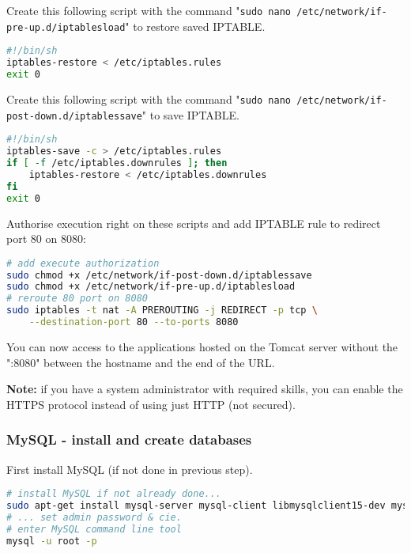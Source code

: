 Create this following script with the command "\texttt{sudo nano /etc/network/if-pre-up.d/iptablesload}" to restore saved IPTABLE.
\begin{lstlisting}[language=bash,caption={/etc/network/if-pre-up.d/iptablesload},frame=bt]
#!/bin/sh
iptables-restore < /etc/iptables.rules
exit 0
\end{lstlisting}

Create this following script with the command "\texttt{sudo nano /etc/network/if-post-down.d/iptablessave}" to save IPTABLE.
\begin{lstlisting}[language=bash,caption={/etc/network/if-post-down.d/iptablessave},frame=bt]
#!/bin/sh
iptables-save -c > /etc/iptables.rules
if [ -f /etc/iptables.downrules ]; then
	iptables-restore < /etc/iptables.downrules
fi
exit 0
\end{lstlisting}

Authorise execution right on these scripts and add IPTABLE rule to redirect port 80 on 8080:
\begin{lstlisting}[language=bash,caption={add execute authorization \& add IPTABLE rule},frame=bt]
# add execute authorization
sudo chmod +x /etc/network/if-post-down.d/iptablessave
sudo chmod +x /etc/network/if-pre-up.d/iptablesload
# reroute 80 port on 8080
sudo iptables -t nat -A PREROUTING -j REDIRECT -p tcp \
	--destination-port 80 --to-ports 8080
\end{lstlisting}

You can now access to the applications hosted on the Tomcat server without the ":8080" between the hostname and the end of the URL.

\textbf{Note:} if you have a system administrator with required skills, you can enable the HTTPS protocol instead of using just HTTP (not secured).

\subsubsection{MySQL - install and create databases}

First install MySQL (if not done in previous step).

\begin{lstlisting}[language=bash,caption={Install MySQL},frame=bt]
# install MySQL if not already done...
sudo apt-get install mysql-server mysql-client libmysqlclient15-dev mysql-common 
# ... set admin password & cie.
# enter MySQL command line tool
mysql -u root -p
\end{lstlisting}

